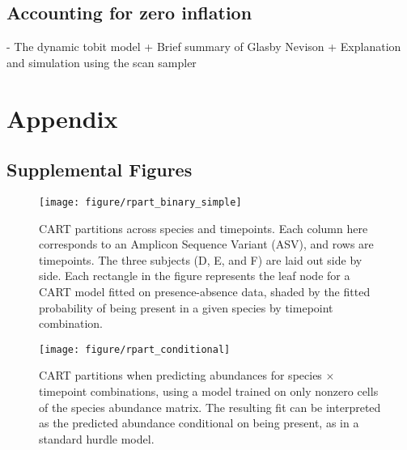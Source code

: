 \documentclass{article}
\begin{document}
\subsection{Accounting for zero inflation}

- The dynamic tobit model
  + Brief summary of Glasby Nevison
  + Explanation and simulation using the scan sampler




\section{Appendix}
\label{sec:appendix}

\subsection{Supplemental Figures}
\label{subsec:supplemental_figures}

\begin{figure}[ht]
  \centering
  \caption{\label{fig:rpart_simple} }
\end{figure}

\begin{figure}[ht]
  \centering
  \caption{\label{fig:label} }
\end{figure}

\begin{figure}[ht]
  \centering
  \caption{\label{fig:rpart_complex_3} }
\end{figure}

\begin{figure}[ht]
  \centering
  \texttt{[image: figure/rpart\_binary\_simple]}
  \caption{CART partitions across species and timepoints. Each column here
    corresponds to an Amplicon Sequence Variant (ASV), and rows are timepoints.
    The three subjects (D, E, and F) are laid out side by side. Each rectangle
    in the figure represents the leaf node for a CART model fitted on
    presence-absence data, shaded by the fitted probability of being present in
    a given species by timepoint combination.
    \label{fig:rpart_binary_simple}}
\end{figure}

\begin{figure}[ht]
  \centering
  \texttt{[image: figure/rpart\_conditional]}
  \caption{CART partitions when predicting abundances for species $\times$
    timepoint combinations, using a model trained on only nonzero cells of the
    species abundance matrix. The resulting fit can be interpreted as the
    predicted abundance conditional on being present, as in a standard hurdle
    model. \label{fig:rpart_conditional} }
\end{figure}
\end{document}
